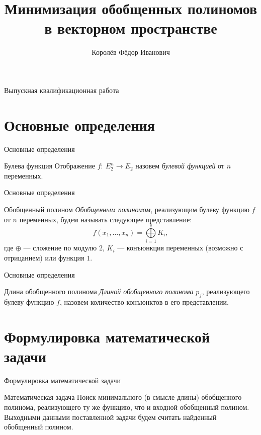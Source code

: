 \documentclass{beamer}
\title{Минимизация обобщенных полиномов в векторном пространстве}
\author[Королёв~Ф.И.]{Королёв Фёдор Иванович}
\institute[МГУ им. М.В.~Ломоносова]{Московский государственный университет имени М.В.~Ломоносова}
\begin{document}
\begin{frame}{Выпускная квалификационная работа}
\titlepage
\end{frame}

\section[Определения]{Основные определения}
\begin{frame}{Основные определения}

\begin{block}{Булева функция}
Отображение $ f:\ E_2^n \rightarrow E_2 $ назовем \textit{булевой функцией} от $ n $ переменных.
\end{block}

\end{frame}
\begin{frame}{Основные определения}

\begin{block}{Обобщенный полином}
\textit{Обобщенным полиномом}, реализующим булеву функцию $ f $ от $ n $ переменных, будем называть следующее представление:
$$ f(x_1, \dots, x_n) = \bigoplus\limits_{i = 1}^s K_i, $$
где $ \oplus $ --- сложение по модулю 2, $ K_i $ --- конъюнкция переменных (возможно с отрицанием) или функция $ 1 $.
\end{block}

\end{frame}
\begin{frame}{Основные определения}

\begin{block}{Длина обобщенного полинома}
\textit{Длиной обобщенного полинома} $ p_f $, реализующего булеву функцию $ f $, назовем количество конъюнктов в его представлении.
\end{block}

\end{frame}

\section[Математическая задача]{Формулировка математической задачи}
\begin{frame}{Формулировка математической задачи}

\begin{block}{Математическая задача}
Поиск минимального (в смысле длины) обобщенного полинома, реализующего ту же функцию, что и входной обобщенный полином. Выходными данными поставленной задачи будем считать найденный обобщенный полином.
\end{block}

\end{frame}
\end{document}
